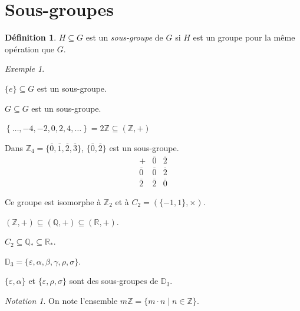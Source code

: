 \documentclass{report}
\newcommand*{\reels}{\mathbb{R}}
\newcommand*{\entiers}{\mathbb{Z}}
\newcommand*{\rationels}{\mathbb{Q}}
\theoremstyle{definition}
\newtheorem*{defin}{D\'efinition}
\theoremstyle{remark}
\newtheorem*{exem}{Exemple}
\newtheorem*{nota}{Notation}
\begin{document}
	\section*{Sous-groupes}
	\begin{defin}
		$H \subseteq G$ est un \emph{sous-groupe} de $G$ si $H$ est un groupe pour la m\^eme op\'eration que $G$.
	\end{defin}
	\begin{exem}
		~

		\begin{ulist}
			\item $\{e\} \subseteq G$ est un sous-groupe.
			\item $G \subseteq G$ est un sous-groupe.
			\item $\left\lbrace \dotsc, -4, -2, 0, 2, 4, \dotsc \right\rbrace = 2\entiers \subseteq (\entiers,+)$
			\item Dans $\entiers_4 = \{\overline0, \overline1, \overline2, \overline3\}$, $\{\overline0, \overline2\}$ est un sous-groupe.
			\renewcommand{\arraystretch}{1.5}
			\[
			\begin{array}{c||c|c}
				+&\overline0&\overline2\\
				\hline\hline
				\overline0&\overline0&\overline2\\
				\hline
				\overline2&\overline2&\overline0
			\end{array}
			\]
			\renewcommand{\arraystretch}{1}

			Ce groupe est isomorphe \`a $\entiers_2$ et \`a $C_2=\left( \{-1,1\}, \times \right)$.
			\item $(\entiers,+) \subseteq (\rationels,+) \subseteq (\reels,+)$.
			\item $C_2 \subseteq \rationels_* \subseteq \reels_*$.
			\item $\mathbb{D}_3 = \{\varepsilon, \alpha, \beta, \gamma, \rho, \sigma\}$.

			$\{\varepsilon, \alpha\}$ et $\{\varepsilon, \rho, \sigma\}$ sont des sous-groupes de $\mathbb{D}_3$.
		\end{ulist}
		\begin{nota}
			On note l'ensemble $m\entiers = \{m \cdot n \mid n \in \entiers\}$.
		\end{nota}
	\end{exem}
\end{document}
